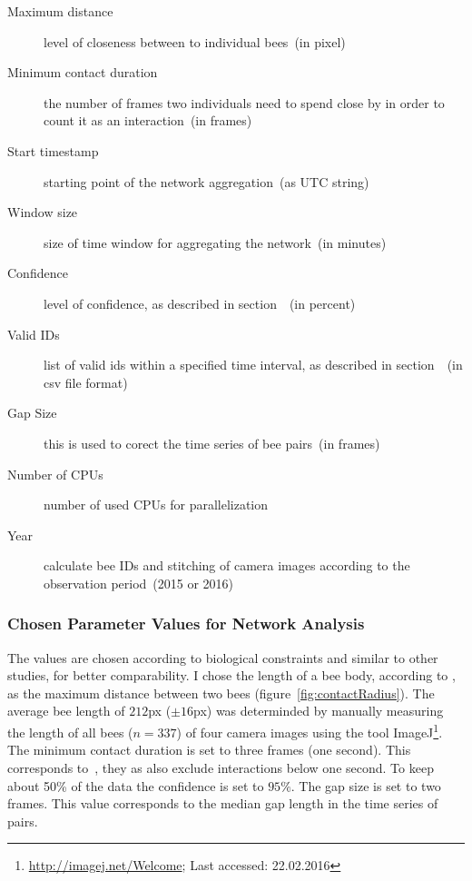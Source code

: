 \begin{description}
\item[Maximum distance] level of closeness between to individual bees~(in pixel)
\item[Minimum contact duration] the number of frames two individuals need to spend close by in order to count it as an interaction~(in frames)
\item [Start timestamp] starting point of the network aggregation~(as UTC string)
\item [Window size] size of time window for aggregating the network~(in minutes)

\vspace{5mm}

\item[Confidence] level of confidence, as described in section~~(in percent)
\item[Valid IDs] list of valid ids within a specified time interval, as described in section~~(in csv file format)
\item[Gap Size] this is used to corect the time series of bee pairs~(in frames)
\item[Number of CPUs] number of used CPUs for parallelization
\item[Year] calculate bee IDs and stitching of camera images according to the observation period~(2015 or 2016)
\end{description}

\subsubsection{Chosen Parameter Values for Network Analysis}


The values are chosen according to biological constraints and similar to other studies, for better comparability.
I chose the length of a bee body, according to \textcite{baracchi2014socio}, as the maximum distance between two bees (figure~\ref{fig:contactRadius}). The average bee length of $212$px ($\pm 16$px)  was determinded by manually measuring the length of all bees ($n=337$) of four camera images using the tool ImageJ\footnote{\url{http://imagej.net/Welcome}; Last accessed:
 22.02.2016}.
The minimum contact duration is set to three frames (one second). This corresponds to~\textcite{mersch2013tracking}, they as also exclude interactions below one second.
To keep about 50\% of the data the confidence is set to $95\%$.
The gap size is set to two frames. This value corresponds to the median gap length in the time series of pairs.

